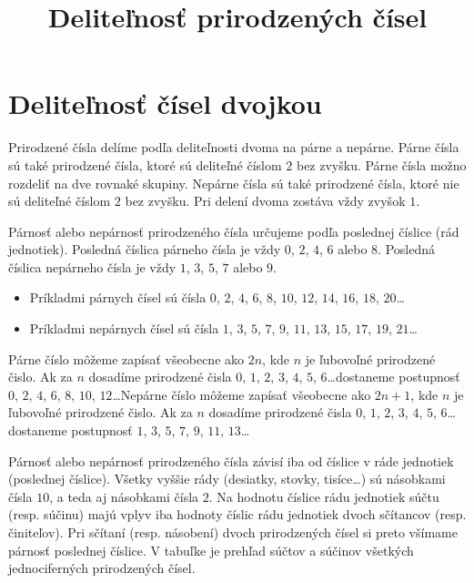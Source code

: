 \documentclass{article}
\title{Deliteľnosť prirodzených čísel}
\begin{document}
\maketitle

\section{Deliteľnosť čísel dvojkou}

Prirodzené čísla delíme podľa deliteľnosti dvoma na párne a nepárne. Párne čísla sú také prirodzené čísla, ktoré sú deliteľné číslom \(2\) bez zvyšku. Párne čísla možno rozdeliť na dve rovnaké skupiny. Nepárne čísla sú také prirodzené čísla, ktoré nie sú deliteľné číslom \(2\) bez zvyšku. Pri delení dvoma zostáva vždy zvyšok \(1\).

Párnosť alebo nepárnosť prirodzeného čísla určujeme podľa poslednej číslice (rád jednotiek). Posledná číslica párneho čísla je vždy \(0\), \(2\), \(4\), \(6\) alebo \(8\). Posledná číslica nepárneho čísla je vždy \(1\), \(3\), \(5\), \(7\) alebo \(9\).
\begin{itemize}
  \item Príkladmi párnych čísel sú čísla \(0\), \(2\), \(4\), \(6\), \(8\), \(10\), \(12\), \(14\), \(16\), \(18\), \(20\)\dots
  \item Príkladmi nepárnych čísel sú čísla \(1\), \(3\), \(5\), \(7\), \(9\), \(11\), \(13\), \(15\), \(17\), \(19\), \(21\)\dots
\end{itemize}

Párne číslo môžeme zapísať všeobecne ako \(2n\), kde \(n\) je ľubovoľné prirodzené čislo. Ak za \(n\) dosadíme prirodzené čisla \(0\), \(1\), \(2\), \(3\), \(4\), \(5\), \(6\)\dots dostaneme postupnosť \(0\), \(2\), \(4\), \(6\), \(8\), \(10\), \(12\)\dots Nepárne číslo môžeme zapísať všeobecne ako \(2n+1\), kde \(n\) je ľubovoľné prirodzené čislo. Ak za \(n\) dosadíme prirodzené čisla \(0\), \(1\), \(2\), \(3\), \(4\), \(5\), \(6\)\dots dostaneme postupnosť \(1\), \(3\), \(5\), \(7\), \(9\), \(11\), \(13\)\dots

Párnosť alebo nepárnosť prirodzeného čísla závisí iba od číslice v ráde jednotiek (poslednej číslice). Všetky vyššie rády (desiatky, stovky, tisíce\dots) sú násobkami čísla \(10\), a teda aj násobkami čísla \(2\). Na hodnotu číslice rádu jednotiek súčtu (resp. súčinu) majú vplyv iba hodnoty číslic rádu jednotiek dvoch sčítancov (resp. činiteľov). Pri sčítaní (resp. násobení) dvoch prirodzených čísel si preto všímame párnosť poslednej číslice. V tabuľke je prehľad súčtov a súčinov všetkých jednociferných prirodzených čísel.
\end{document}
